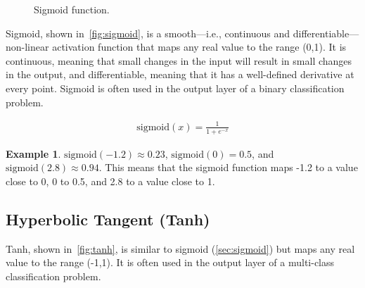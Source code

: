 \documentclass[oneside,11pt,dvipsnames]{book}
\numberwithin{equation}{section}
\theoremstyle{definition}
\newtheorem{example}{Example}[section]
\theoremstyle{remark}
\newcommand{\sigmoid}[1]{\mathrm{sigmoid}\left(#1\right)}
\begin{document}
\begin{figure}[ht]
    \centering
    \caption{Sigmoid function.}\label{fig:sigmoid}
\end{figure}

Sigmoid, shown in~\autoref{fig:sigmoid}, is a smooth---i.e., continuous and differentiable---non-linear activation function that maps any real value to the range (0,1).
It is continuous, meaning that small changes in the input will result in small changes in the output, and differentiable, meaning that it has a well-defined derivative at every point. Sigmoid is often used in the output layer of a binary classification problem.

    \begin{align}
        \sigmoid{x} = \frac{1}{1+e^{-x}}
    \end{align}

\begin{example}
$\sigmoid{-1.2} \approx 0.23$, $\sigmoid{0} = 0.5$, and $\sigmoid{2.8} \approx 0.94$. This means that the sigmoid function maps -1.2 to a value close to 0, 0 to 0.5, and 2.8 to a value close to 1.
\end{example}

\subsection{Hyperbolic Tangent (Tanh)}\label{sec:tanh}

Tanh, shown in~\autoref{fig:tanh}, is similar to sigmoid (\autoref{sec:sigmoid})  but maps any real value to the range (-1,1). It is often used in the output layer of a multi-class classification problem.
\end{document}
